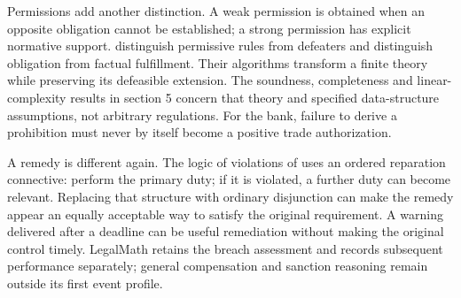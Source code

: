 Permissions add another distinction. A weak permission is obtained when an
opposite obligation cannot be established; a strong permission has explicit
normative support. \citet[secs.~2--3, 6]{permissions2012} distinguish permissive
rules from defeaters and distinguish obligation from factual fulfillment.
Their algorithms transform a finite theory while preserving its defeasible
extension. The soundness, completeness and linear-complexity results in section 5
concern that theory and specified data-structure assumptions, not arbitrary
regulations. For the bank, failure to derive a prohibition must never by itself
become a positive trade authorization.

A remedy is different again. The logic of violations of
\citet[secs.~2--5]{violations2006} uses an ordered reparation connective: perform
the primary duty; if it is violated, a further duty can become relevant.
Replacing that structure with ordinary disjunction can make the remedy appear
an equally acceptable way to satisfy the original requirement. A warning delivered
after a deadline can be useful remediation without making the original control
timely. LegalMath retains the breach assessment and records subsequent performance
separately; general compensation and sanction reasoning remain outside its first
event profile.
